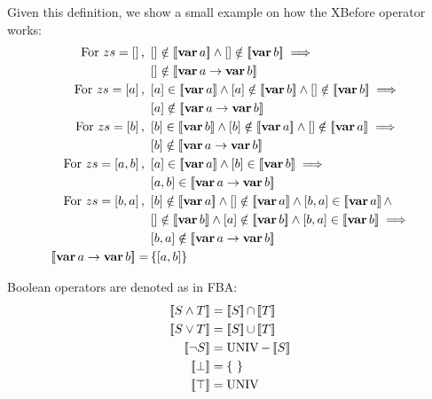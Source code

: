Given this definition, we show a small example on how the \ac{XBefore} operator works:
%
\begin{align}
\text{For } zs = \listsin{} \text{, } &
  \listsin{} \notin \denote{\var{a}} \land 
  \listsin{} \notin \denote{\var{b}} 
  \implies\nonumber\\
  & \listsin{} \notin \denote{\xbefore{\var{a}}{\var{b}}} \nonumber\\
\text{For } zs = \listsin{a} \text{, } &
  \listsin{a} \in \denote{\var{a}} \land 
  \listsin{a} \notin \denote{\var{b}} \land 
  \listsin{} \notin \denote{\var{b}} 
  \implies\nonumber\\
  & \listsin{a} \notin \denote{\xbefore{\var{a}}{\var{b}}} \nonumber\\
\text{For } zs = \listsin{b} \text{, } &
  \listsin{b} \in \denote{\var{b}} \land
  \listsin{b} \notin \denote{\var{a}} \land 
  \listsin{} \notin \denote{\var{a}} 
  \implies\nonumber\\
  & \listsin{b} \notin \denote{\xbefore{\var{a}}{\var{b}}} \nonumber\\
\text{For } zs = \listsin{a,b} \text{, } &
  \listsin{a} \in \denote{\var{a}} \land 
  \listsin{b} \in \denote{\var{b}} 
  \implies\nonumber\\
  & \listsin{a,b} \in \denote{\xbefore{\var{a}}{\var{b}}} \nonumber\\
\text{For } zs = \listsin{b,a} \text{, } &
  \listsin{b} \notin \denote{\var{a}} \land 
  \listsin{} \notin \denote{\var{a}} \land 
  \listsin{b,a} \in \denote{\var{a}} \land\nonumber\\
  & \listsin{} \notin \denote{\var{b}} \land 
  \listsin{a} \notin \denote{\var{b}} \land
  \listsin{b,a} \in \denote{\var{b}}
  \implies\nonumber\\
  & \listsin{b,a} \notin \denote{\xbefore{\var{a}}{\var{b}}} \nonumber\\
\denote{\xbefore{\var{a}}{\var{b}}} = & \left\{\listsin{a,b}\right\}
\end{align}

Boolean operators are denoted as in \ac{FBA}:
\begin{subequations}
\begin{align}
\denote{S \land T} & = \denote{S} \inter \denote{T}\label{eq:denotational-inf}\\
\denote{S \lor T} & = \denote{S} \union \denote{T}\label{eq:denotational-sup}\\
\denote{\lnot S} & = \UNIV - \denote{S} \label{eq:denotational-complement}\\
\denote{\bot} &= \emptyset\label{eq:denotational-bot}\\
\denote{\top} &= \UNIV\label{eq:denotational-top}
\end{align}
\end{subequations}

